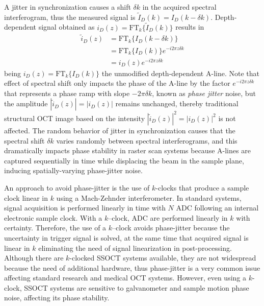 A jitter in synchronization causes a shift $\delta k$ in the acquired spectral interferogram, thus the measured signal is $\tilde{I}_D(k) = I_D(k-\delta k)$. Depth-dependent signal obtained as $i_D(z)= \text{FT}_k\{\tilde{I}_D(k)\}$ results in
\begin{align*}
    \tilde{i}_D(z) &= \text{FT}_k\{I_D(k-\delta k)\} \nonumber \\
    &=  \text{FT}_k\{I_D(k)\} e^{-i2\pi z\delta k} \nonumber \\
    &=  i_D(z) e^{-i2\pi z\delta k}
\end{align*}
being $i_D(z)=\text{FT}_k\{I_D(k)\}$ the unmodified depth-dependent A-line. Note that effect of spectral shift only impacts the phase of the A-line by the factor $e^{-i2\pi z\delta k}$ that represents a phase ramp with slope $-2\pi\delta k$, known as \textit{phase jitter} noise, but the amplitude $|\tilde{i}_D(z)|=|i_D(z)|$ remains unchanged, thereby traditional structural OCT image based on the intensity $|\tilde{i}_D(z)|^2=|i_D(z)|^2$ is not affected. The random behavior of jitter in synchronization causes that the spectral shift $\delta k$ varies randomly between spectral interferograms, and this dramatically impacts phase stability in raster scan systems because A-lines are captured sequentially in time while displacing the beam in the sample plane, inducing spatially-varying phase-jitter noise.

An approach to avoid phase-jitter is the use of $k$-clocks that produce a sample clock linear in $k$ using a Mach-Zehnder interferometer. In standard systems, signal acquisition is performed linearly in time with $N$ ADC following an internal electronic sample clock. With a $k$--clock, ADC are performed linearly in $k$ with certainty. Therefore, the use of a $k$--clock avoids phase-jitter because the uncertainty in trigger signal is solved, at the same time that acquired signal is linear in $k$ eliminating the need of signal linearization in post-processing. Although there are $k$-clocked SSOCT systems available, they are not widespread because the need of additional hardware, thus phase-jitter is a very common issue affecting standard research and medical OCT systems. However, even using a $k$-clock, SSOCT systems are sensitive to galvanometer and sample motion phase noise, affecting its phase stability.

